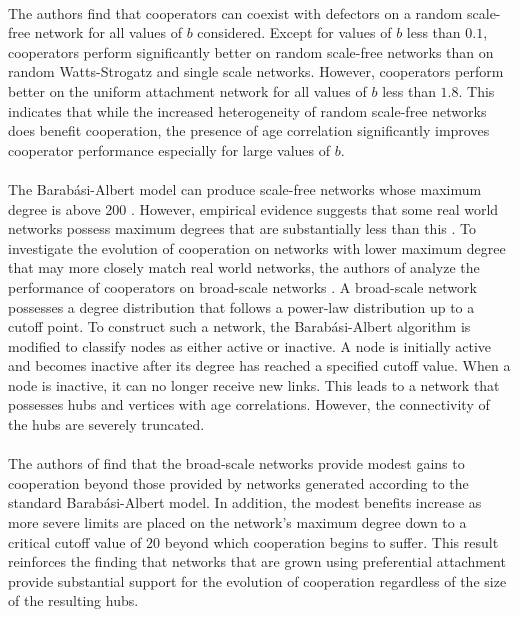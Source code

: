 \documentclass{article}
\begin{document}
	\paragraph{}The authors find that cooperators can coexist with defectors on a random scale-free network for all values of $b$ considered.  Except for values of $b$ less than $0.1$, cooperators perform significantly better on random scale-free networks than on random Watts-Strogatz and single scale networks.  However, cooperators perform better on the uniform attachment network for all values of $b$ less than $1.8$.  This indicates that while the increased heterogeneity of random scale-free networks does benefit cooperation, the presence of age correlation significantly improves cooperator performance especially for large values of $b$.
	\paragraph{}The Barab\'{a}si-Albert model can produce scale-free networks whose maximum degree is above 200 \cite{Santos2006a}.  However, empirical evidence suggests that some real world networks possess maximum degrees that are substantially less than this \cite{Dorogovtsev2003}.  To investigate the evolution of cooperation on networks with lower maximum degree that may more closely match real world networks, the authors of \cite{Santos2006a} analyze the performance of cooperators on broad-scale networks \cite{Amaral2000}.  A broad-scale network possesses a degree distribution that follows a power-law distribution up to a cutoff point.  To construct such a network, the Barab\'{a}si-Albert algorithm is modified to classify nodes as either active or inactive.  A node is initially active and becomes inactive after its degree has reached a specified cutoff value.  When a node is inactive, it can no longer receive new links.  This leads to a network that possesses hubs and vertices with age correlations.  However, the connectivity of the hubs are severely truncated. 
	\paragraph{}The authors of \cite{Santos2006a} find that the broad-scale networks provide modest gains to cooperation beyond those provided by networks generated according to the standard Barab\'{a}si-Albert model.  In addition, the modest benefits increase as more severe limits are placed on the network's maximum degree down to a critical cutoff value of $20$ beyond which cooperation begins to suffer.  This result reinforces the finding that networks that are grown using preferential attachment provide substantial support for the evolution of cooperation regardless of the size of the resulting hubs.
\end{document}
